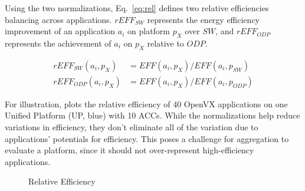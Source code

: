 Using the two normalizations, Eq.~\eqref{eq:rel} defines two relative efficiencies balancing across applications. $rEFF_{SW}$ represents the energy efficiency improvement of an application $a_i$ on platform $p_X$ over $SW$, and $rEFF_{ODP}$ represents the achievement of $a_i$ on $p_X$ relative to $ODP$.

\vspace{-8pt}
\begin{equation}
\begin{split}
	rEFF_{SW}(a_{i}, p_{X}) &= EFF(a_{i}, p_{X}) / EFF(a_{i}, p_{SW}) \\
	rEFF_{ODP}(a_{i}, p_{X}) &= EFF(a_{i}, p_{X}) / EFF(a_{i}, p_{ODP})
\label{eq:rel}
\end{split}
\end{equation}

For illustration,  plots the relative efficiency of 40 OpenVX applications on one Unified Platform (UP, blue) with 10 ACCs. While the normalizations help reduce variations in efficiency, they don't eliminate all of the variation due to applications' potentials for efficiency. This poses a challenge for aggregation to evaluate a platform, since it should not over-represent high-efficiency applications.

\vspace{-4pt}
\begin{figure}[h]
	\centering
		\hfill
    \vspace{-8pt}
	\caption{Relative Efficiency}
	\label{fig:eff}
\end{figure}